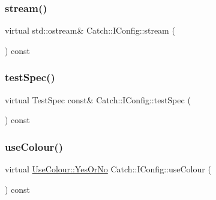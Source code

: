 \mbox{\label{struct_catch_1_1_i_config_aa4c3fe0825e7e6ebdcfa6abc7abf3617}} 
\subsubsection{\texorpdfstring{stream()}{stream()}}
{\footnotesize\ttfamily virtual std\+::ostream\& Catch\+::\+I\+Config\+::stream (\begin{DoxyParamCaption}{ }\end{DoxyParamCaption}) const\hspace{0.3cm}{\ttfamily [pure virtual]}}

\mbox{\label{struct_catch_1_1_i_config_a03a2fd8221d896d12bf3684ab2a03588}} 
\subsubsection{\texorpdfstring{test\+Spec()}{testSpec()}}
{\footnotesize\ttfamily virtual Test\+Spec const\& Catch\+::\+I\+Config\+::test\+Spec (\begin{DoxyParamCaption}{ }\end{DoxyParamCaption}) const\hspace{0.3cm}{\ttfamily [pure virtual]}}

\mbox{\label{struct_catch_1_1_i_config_a87ec19a6b486eb5b5015cf7738fee026}} 
\subsubsection{\texorpdfstring{use\+Colour()}{useColour()}}
{\footnotesize\ttfamily virtual \mbox{\hyperlink{struct_catch_1_1_use_colour_a6aa78da0c2de7539bb9e3757e204a3f1}{Use\+Colour\+::\+Yes\+Or\+No}} Catch\+::\+I\+Config\+::use\+Colour (\begin{DoxyParamCaption}{ }\end{DoxyParamCaption}) const\hspace{0.3cm}{\ttfamily [pure virtual]}}

